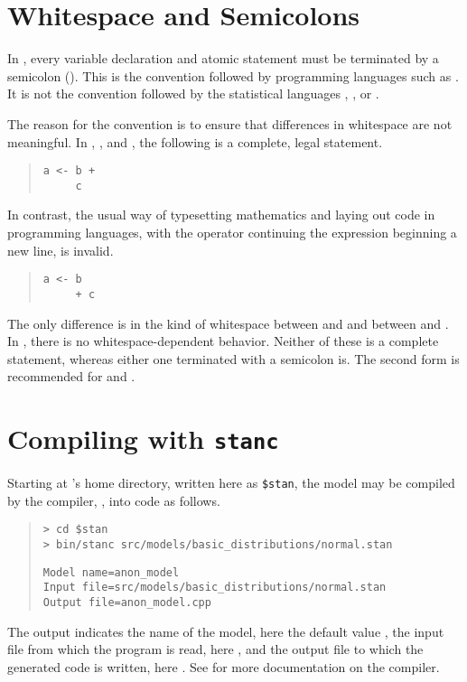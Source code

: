 \section{Whitespace and Semicolons}

In \Stan, every variable declaration and atomic statement must be
terminated by a semicolon (\code{;}).  This is the convention followed
by programming languages such as \Cpp.  It is not the convention
followed by the statistical languages \R, \BUGS, or \JAGS.

The reason for the \Cpp convention is to ensure that differences in
whitespace are not meaningful.  In \R, \BUGS, and \JAGS, the following
is a complete, legal statement.
%
\begin{quote}
\begin{Verbatim}
a <- b +
     c
\end{Verbatim}
\end{quote}
%
In contrast, the usual way of typesetting mathematics and laying out
code in programming languages, with the operator continuing the
expression beginning a new line, is invalid.
%
\begin{quote}
\begin{Verbatim}
a <- b
     + c
\end{Verbatim}
\end{quote}
%
The only difference is in the kind of whitespace between  and
\code{+} and between \code{+} and .  In \Stan, there is no
whitespace-dependent behavior.  Neither of these is a complete
statement, whereas either one terminated with a semicolon is.  The
second form is recommended for \Cpp and \Stan.


\section{Compiling  with {\tt\bfseries stanc}}

Starting at \Stan's home directory, written here as {\tt \$stan},
the model may be compiled by the \Stan compiler, \stanc, into \Cpp code
as follows.
%
\begin{quote}
\begin{Verbatim}[fontshape=sl]
> cd $stan
> bin/stanc src/models/basic_distributions/normal.stan
\end{Verbatim}
%
\begin{Verbatim}
Model name=anon_model
Input file=src/models/basic_distributions/normal.stan
Output file=anon_model.cpp
\end{Verbatim}
\end{quote}
%
The output indicates the name of the model, here the default value
, the input file from which the \Stan program is
read, here , and the output file to which the
generated \Cpp code is written, here .  See
 for more documentation on the \stanc compiler.

